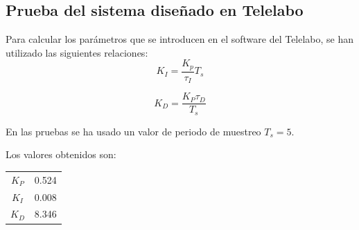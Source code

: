 \documentclass[a4paper]{article}
\begin{document}
\subsection{Prueba del sistema diseñado en Telelabo}

Para calcular los parámetros que se introducen en el software del Telelabo, se han utilizado las siguientes relaciones:
\begin{equation}
	K_I=\frac{K_p}{\tau_I} T_s
\end{equation}

\begin{equation}
	K_{D}=\frac{K_P \tau_{D}}{T_s}
\end{equation}

En las pruebas se ha usado un valor de periodo de muestreo $T_s=5$.


Los valores obtenidos son:
\begin{center}
	\begin{tabular}{c|c}
		$K_P$ & 0.524 \\
		$K_I$ & 0.008 \\
		$K_{D}$ & 8.346 \\
	\end{tabular}
\end{center}
\end{document}

